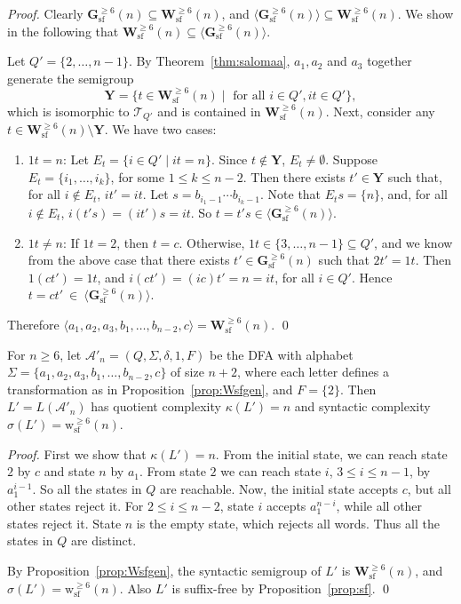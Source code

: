 \documentclass{llncs}
\renewcommand{\le}{\leqslant}
\renewcommand{\ge}{\geqslant}
\newcommand{\Sig}{\Sigma}
\newcommand{\be}{\begin{enumerate}}
\newcommand{\ee}{\end{enumerate}}
\newcommand{\txt}[1]{\mbox{ #1 }}
\newcommand{\cA}{{\mathcal A}}
\newcommand{\cT}{{\mathcal T}}
\newcommand{\Wsf}{\mathbf{W}^{\ge 6}_{\mathrm{sf}}}
\newcommand{\Hsf}{\mathbf{G}^{\ge 6}_{\mathrm{sf}}}
\newcommand{\wsf}{{\mathrm{w}^{\ge 6}_{\mathrm{sf}}}}
\begin{document}
\begin{proof} 
Clearly $\Hsf(n) \subseteq \Wsf(n)$, and $\langle \Hsf(n) \rangle \subseteq \Wsf(n)$. We show in the following that $\Wsf(n) \subseteq \langle \Hsf(n) \rangle$. 

Let $Q' = \{2,\ldots,n-1\}$. By Theorem~\ref{thm:salomaa}, $a_1,a_2$ and $a_3$ together generate the semigroup $$\mathbf{Y} = \{t \in \Wsf(n) \mid \txt{for all} i \in Q', it \in Q'\},$$ which is isomorphic to $\cT_{Q'}$ and is contained in $\Wsf(n)$. Next, consider any $t \in \Wsf(n) \setminus \mathbf{Y}$. We have two cases: 
\be 
\item $1t = n$: Let $E_t = \{ i \in Q' \mid it = n \}$. Since $t \not\in \mathbf{Y}$, $E_t \neq \emptyset$. Suppose $E_t = \{i_1,\ldots,i_k\}$, for some $1 \le k \le n-2$. Then there exists $t' \in \mathbf{Y}$ such that, for all $i \not\in E_t$, $it' = it$. Let $s = b_{i_1-1} \cdots b_{i_k-1}$. Note that $E_ts = \{n\}$, and, for all $i \not\in E_t$, $i(t's) = (it')s = it$. So $t = t's \in \langle \Hsf(n) \rangle$. 
\item $1t \neq n$: If $1t = 2$, then $t = c$. Otherwise, $1t \in \{3,\ldots,n-1\} \subseteq Q'$, and we know from the above case that there exists $t' \in \Hsf(n)$ such that $2t' = 1t$. Then $1(ct') = 1t$, and $i(ct') = (ic)t' = n = it$, for all $i \in Q'$. Hence $t = ct'~\in~\langle \Hsf(n) \rangle$. 
\ee 

Therefore $\langle a_1,a_2,a_3,b_1,\ldots,b_{n-2},c \rangle = \Wsf(n)$. \qed
\end{proof}

\begin{theorem}\label{thm:wsfaut} 
For $n \ge 6$, let $\cA'_n = (Q, \Sig, \delta, 1, F)$ be the DFA with alphabet $\Sig = \{a_1,a_2,a_3,b_1,\ldots,b_{n-2},c\}$ of size $n+2$, where each letter defines a transformation as in Proposition~\ref{prop:Wsfgen}, and $F = \{2\}$. Then $L' = L(\cA'_n)$ has quotient complexity $\kappa(L') = n$ and syntactic complexity $\sigma(L') = \wsf(n)$. 
\end{theorem}

\begin{proof}
First we show that $\kappa(L') = n$. From the initial state, we can reach state $2$ by $c$ and state $n$ by $a_1$. From state $2$ we can reach state $i$, $3 \le i \le n-1$, by $a_1^{i-1}$. So all the states in $Q$ are reachable. Now, the initial state accepts $c$, but all other states reject it. For $2 \le i \le n-2$, state $i$ accepts $a_1^{n-i}$, while all other states reject it. State $n$ is the empty state, which rejects all words. Thus all the states in $Q$ are distinct. 

By Proposition~\ref{prop:Wsfgen}, the syntactic semigroup of $L'$ is $\Wsf(n)$, and $\sigma(L') = \wsf(n)$. Also $L'$ is suffix-free by Proposition~\ref{prop:sf}. \qed
\end{proof}
\end{document}
